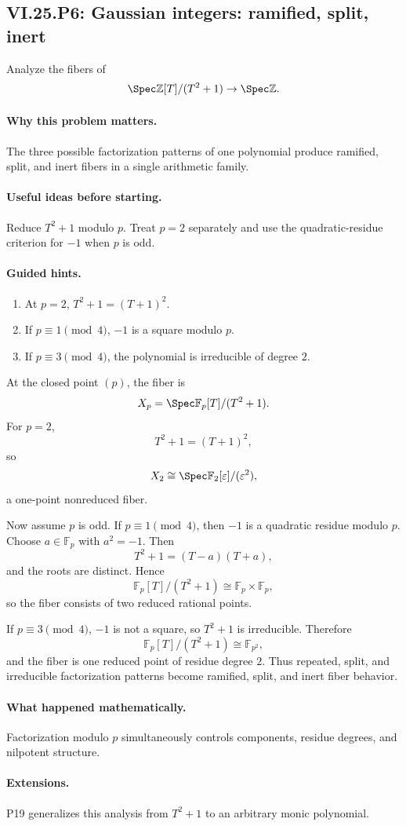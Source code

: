 \subsection*{VI.25.P6: Gaussian integers: ramified, split, inert}
\begin{problem}\label{prob:vi25-p06}
Analyze the fibers of
\[
\Spec\mathbb Z[T]/(T^2+1)\to\Spec\mathbb Z.
\]
\end{problem}

\ifdefined\FullProblemDossiers
\paragraph{Why this problem matters.}
The three possible factorization patterns of one polynomial produce ramified, split, and inert fibers in a single arithmetic family.

\paragraph{Useful ideas before starting.}
Reduce \(T^2+1\) modulo \(p\).  Treat \(p=2\) separately and use the quadratic-residue criterion for \(-1\) when \(p\) is odd.

\paragraph{Guided hints.}
\begin{enumerate}
\item At \(p=2\), \(T^2+1=(T+1)^2\).
\item If \(p\equiv1\pmod4\), \(-1\) is a square modulo \(p\).
\item If \(p\equiv3\pmod4\), the polynomial is irreducible of degree \(2\).
\end{enumerate}

\begin{solution}
At the closed point \((p)\), the fiber is
\[
X_p=\Spec\mathbb F_p[T]/(T^2+1).
\]
For \(p=2\),
\[
T^2+1=(T+1)^2,
\]
so
\[
X_2\cong\Spec\mathbb F_2[\varepsilon]/(\varepsilon^2),
\]
a one-point nonreduced fiber.

Now assume \(p\) is odd.  If \(p\equiv1\pmod4\), then \(-1\) is a quadratic residue modulo \(p\).  Choose \(a\in\mathbb F_p\) with \(a^2=-1\).  Then
\[
T^2+1=(T-a)(T+a),
\]
and the roots are distinct.  Hence
\[
\mathbb F_p[T]/(T^2+1)\cong\mathbb F_p\times\mathbb F_p,
\]
so the fiber consists of two reduced rational points.

If \(p\equiv3\pmod4\), \(-1\) is not a square, so \(T^2+1\) is irreducible.  Therefore
\[
\mathbb F_p[T]/(T^2+1)\cong\mathbb F_{p^2},
\]
and the fiber is one reduced point of residue degree \(2\).  Thus repeated, split, and irreducible factorization patterns become ramified, split, and inert fiber behavior.
\end{solution}

\paragraph{What happened mathematically.}
Factorization modulo \(p\) simultaneously controls components, residue degrees, and nilpotent structure.

\paragraph{Extensions.}
P19 generalizes this analysis from \(T^2+1\) to an arbitrary monic polynomial.
\fi
